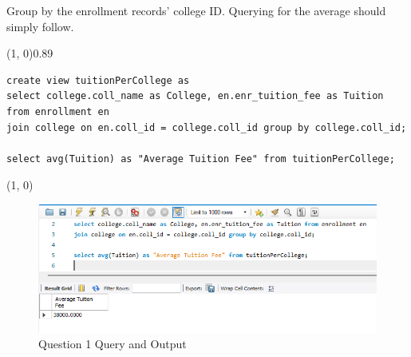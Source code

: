 
Group by the enrollment records' college ID. Querying for the average should simply follow.
\vspace{\baselineskip}

\sol{}
\noindent\line(1, 0){0.89\linewidth}
\begin{verbatim}
create view tuitionPerCollege as
select college.coll_name as College, en.enr_tuition_fee as Tuition from enrollment en
join college on en.coll_id = college.coll_id group by college.coll_id;

select avg(Tuition) as "Average Tuition Fee" from tuitionPerCollege;
\end{verbatim}
\noindent\line(1, 0){\linewidth}

\begin{figure}[H]
    \centering
    \includegraphics[width=0.7\linewidth]{images/q1.png}
    \caption{Question 1 Query and Output}
\end{figure}
